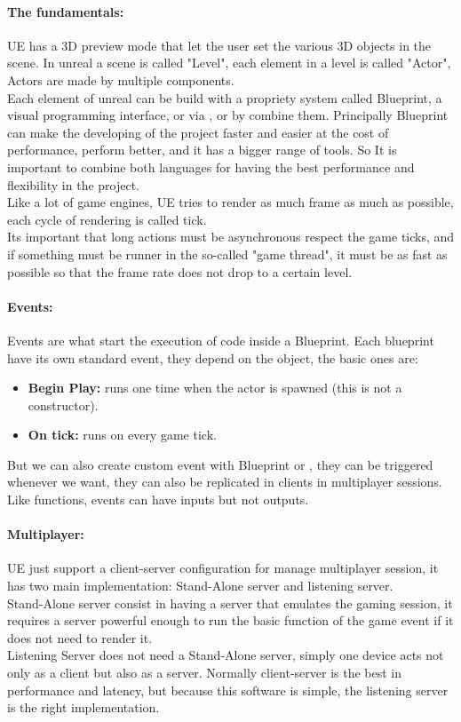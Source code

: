 \paragraph{The fundamentals:}
\ac{UE} has a 3D preview mode that let the user set the various 3D objects in the scene. 
In unreal a scene is called "Level", each element in a level is called "Actor", Actors are made by multiple components.\\
Each element of unreal can be build with a propriety system called Blueprint, a visual programming interface, or via \cpp, or by combine them.
Principally Blueprint can make the developing of the project faster and easier at the cost of performance, \cpp perform better, and it has a bigger range of tools.
So It is important to combine both languages for having the best performance and flexibility in the project.\\
Like a lot of game engines, \ac{UE} tries to render as much frame as much as possible, each cycle of rendering is called tick.\\
Its important that long actions must be asynchronous respect the game ticks, and if something must be runner in the so-called "game thread", it must be as fast as possible so that the frame rate does not drop to a certain level.

\paragraph{Events:}
Events are what start the execution of code inside a Blueprint. Each blueprint have its own standard event, they depend on the object, the basic ones are:
\begin{itemize}
  \item \textbf{Begin Play:} runs one time when the actor is spawned (this is not a constructor).
  \item \textbf{On tick:} runs on every game tick.
\end{itemize}
\noindent
But we can also create custom event with Blueprint or \cpp, they can be triggered whenever we want, they can also be replicated in clients in multiplayer sessions. 
Like functions, events can have inputs but not outputs.

\paragraph{Multiplayer:}
\ac{UE} just support a client-server configuration for manage multiplayer session, it has two main implementation: Stand-Alone server and listening server.\\
Stand-Alone server consist in having a server that emulates the gaming session, it requires a server powerful enough to run the basic function of the game event if it does not need to render it.\\
Listening Server does not need a Stand-Alone server, simply one device acts not only as a client but also as a server. Normally client-server is the best in performance and latency, but because this software is simple, the listening server is the right implementation.

